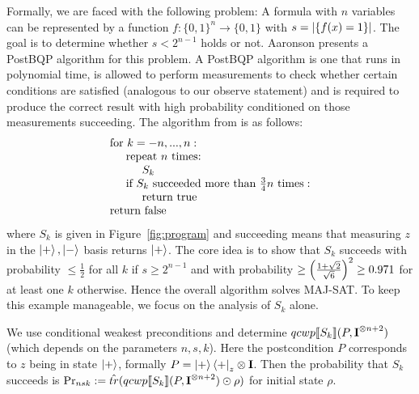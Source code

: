\documentclass[a4paper,UKenglish,cleveref, autoref, thm-restate]{lipics-v2021}
\begin{document}
Formally, we are faced with the following problem: A formula with $n$ variables can be represented by a function $f:\{0,1\}^n \to \{0,1\}$ with $s = \abs{\{f(x) = 1\}}$. The goal is to determine whether $s < 2^{n-1}$ holds or not.
Aaronson \cite{postbqp} presents a PostBQP algorithm for this problem. A PostBQP algorithm is one that runs in polynomial time, is allowed to perform measurements to check whether certain conditions are satisfied (analogous to our observe statement) and is required to produce the correct result with high probability conditioned on those measurements succeeding.
The algorithm from \cite{postbqp} is as follows:
\[\begin{array}{l}
      \text{for } k = -n , ... , n:\\
      \hspace{0.5cm} \text{repeat }n \text{ times:}\\
      \hspace{1cm} S_k \\
      \hspace{0.5cm}\text{if }S_k \text{ succeeded more than } \frac34 n \text{ times}:\\
      \hspace{1cm} \text{return true} \\
      \text{return false}
    \end{array}
  \]
  where $S_k$ is given in Figure~\ref{fig:program} and succeeding means that measuring $z$ in the $\ket{+}, \ket{-}$ basis returns $\ket{+}$.
The core idea is to show that $S_k$ succeeds with probability $\leq\frac12$ for all $k$ if $s\geq 2^{n-1}$ and with probability $\geq \Bigl(\frac{1+\sqrt2}{\sqrt 6}\Bigr)^2\geq 0.971$ for at least one $k$ otherwise.
Hence the overall algorithm solves MAJ-SAT. To keep this example manageable, we focus on the analysis of $S_k$ alone.

We use conditional weakest preconditions and determine $qcwp\llbracket S_k \rrbracket (P,\textbf{I}^{\otimes n+2})$ (which depends on the parameters $n,s,k$).
Here the postcondition $P$ corresponds to $z$ being in state $\ket+$, formally $P=\ket{+}\bra{+}_z\otimes\textbf{I}$.
Then the probability that $S_k$ succeeds is $\Pr_{nsk}:=\hat{tr}(qcwp\llbracket S_k \rrbracket (P,\textbf{I}^{\otimes n+2}) \odot \rho)$ for initial state $\rho$.
\end{document}
